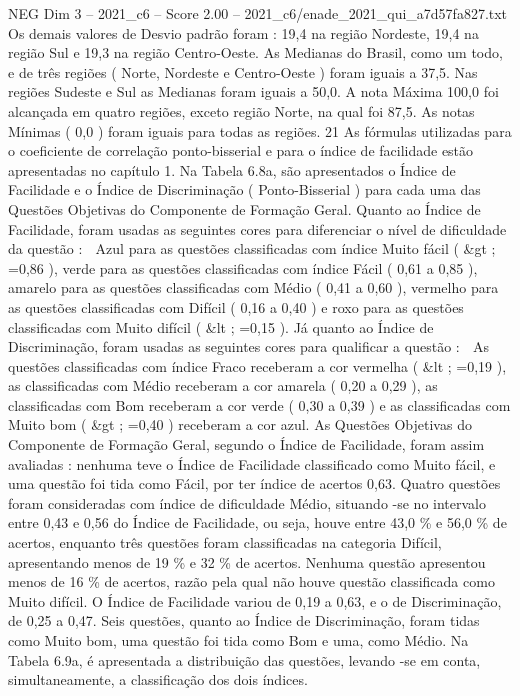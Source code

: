 \begin{textsample}{NEG Dim 3 – 2021\_c6 – Score 2.00 – 2021\_c6/enade\_2021\_qui\_a7d57fa827.txt}
Os demais valores de Desvio padrão foram : 19,4 na região Nordeste, 19,4 na região Sul e 19,3 na região Centro-Oeste.
As Medianas do Brasil, como um todo, e de três regiões ( Norte, Nordeste e Centro-Oeste ) foram iguais a 37,5.
Nas regiões Sudeste e Sul as Medianas foram iguais a 50,0.
A nota Máxima 100,0 foi alcançada em quatro regiões, exceto região Norte, na qual foi 87,5.
As notas Mínimas ( 0,0 ) foram iguais para todas as regiões. 21 As fórmulas utilizadas para o coeficiente de correlação ponto-bisserial e para o índice de facilidade estão apresentadas no capítulo 1.
Na Tabela 6.8a, são apresentados o Índice de Facilidade e o Índice de Discriminação ( Ponto-Bisserial ) para cada uma das Questões Objetivas do Componente de Formação Geral.
Quanto ao Índice de Facilidade, foram usadas as seguintes cores para diferenciar o nível de dificuldade da questão :  Azul para as questões classificadas com índice Muito fácil ( \&gt ; =0,86 ), verde para as questões classificadas com índice Fácil ( 0,61 a 0,85 ), amarelo para as questões classificadas com Médio ( 0,41 a 0,60 ), vermelho para as questões classificadas com Difícil ( 0,16 a 0,40 ) e roxo para as questões classificadas com Muito difícil ( \&lt ; =0,15 ).
Já quanto ao Índice de Discriminação, foram usadas as seguintes cores para qualificar a questão :  As questões classificadas com índice Fraco receberam a cor vermelha ( \&lt ; =0,19 ), as classificadas com Médio receberam a cor amarela ( 0,20 a 0,29 ), as classificadas com Bom receberam a cor verde ( 0,30 a 0,39 ) e as classificadas com Muito bom ( \&gt ; =0,40 ) receberam a cor azul.
As Questões Objetivas do Componente de Formação Geral, segundo o Índice de Facilidade, foram assim avaliadas : nenhuma teve o Índice de Facilidade classificado como Muito fácil, e uma questão foi tida como Fácil, por ter índice de acertos 0,63.
Quatro questões foram consideradas com índice de dificuldade Médio, situando -se no intervalo entre 0,43 e 0,56 do Índice de Facilidade, ou seja, houve entre 43,0 \% e 56,0 \% de acertos, enquanto três questões foram classificadas na categoria Difícil, apresentando menos de 19 \% e 32 \% de acertos.
Nenhuma questão apresentou menos de 16 \% de acertos, razão pela qual não houve questão classificada como Muito difícil.
O Índice de Facilidade variou de 0,19 a 0,63, e o de Discriminação, de 0,25 a 0,47.
Seis questões, quanto ao Índice de Discriminação, foram tidas como Muito bom, uma questão foi tida como Bom e uma, como Médio.
Na Tabela 6.9a, é apresentada a distribuição das questões, levando -se em conta, simultaneamente, a classificação dos dois índices.

\end{textsample}
